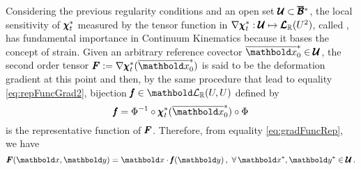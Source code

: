 Considering the previous regularity conditions and an open set $\pmb{\mathcal{U}}\subset\pmb{\overline{\mathcal{B}}}^*$, the local sensitivity of $\pmb{\chi}_t^*$ measured by the tensor function in $\nabla\pmb{\chi}_t^* : \pmb{\mathcal{U}} \mapsto \pmb{\mathcal{L}}_{\mathbb{R}}(U^{2})$, called , has fundamental importance in Continuum Kinematics because it bases the concept of strain. Given an arbitrary reference covector $\overline{\vto{x}}_0^*\in\pmb{\mathcal{U}}$, the second order tensor $\tnr{F}:=\fua{\nabla\tnr{\chi}_t^*}{\overline{\vto{x}}_0^*}$ is said to be the deformation gradient at this point and then, by the same procedure that lead to equality \eqref{eq:repFuncGrad2}, bijection $\tnr{\mathit{f}}\in\evl{\real}{U}{U}$ defined by
\begin{equation}
\tnr{\mathit{f}} = \Phi^{-1}\circ\fua{{\tnr{\chi}_t^{*}}}{\overline{\vto{x}}_0^*}\circ\Phi
\end{equation}
is the representative function of $\pmb{F}$. Therefore, from equality \eqref{eq:gradFuncRep}, we have
\begin{equation}
\fua{\tnr{F}}{\vto{x},\vto{y}}=\vto{x}\cdot\fua{\tnr{\mathit{f}}}{\vto{y}}\,,\,\,\forall\, \vto{x}^*,\vto{y}^*\in\pmb{\mathcal{U}}\,.
\end{equation}






 

